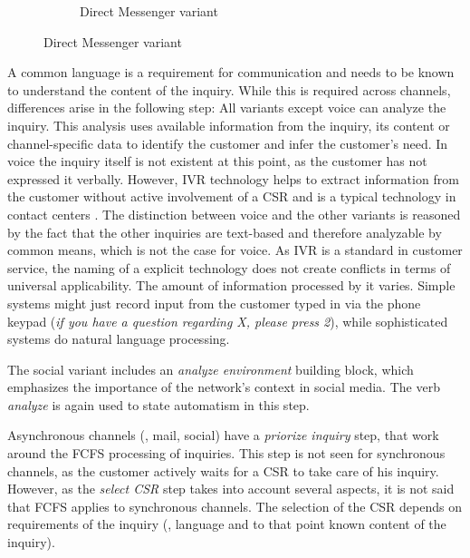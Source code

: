 \begin{figure}[caption={route inquiry detail process}, label={fig:inbound:route}]
\begin{subfigure}[b]{.45\textwidth}
\begin{tikzpicture}
	 		\end{tikzpicture}
	 		\caption{Direct Messenger variant}\label{fig:inbound:route:dm}
	 	\end{subfigure}
	 \end{figure}
	 
	 A common language is a requirement for communication and needs to be known to understand the content of the inquiry. While this is required across channels, differences arise in the following step: All variants except voice can analyze the inquiry. This analysis uses available information from the inquiry, \ie its content or channel-specific data to identify the customer and infer the customer's need. In voice the inquiry itself is not existent at this point, as the customer has not expressed it verbally. However, \acrfull{IVR} technology helps to extract information from the customer without active involvement of a \acrshort{CSR} and is a typical technology in contact centers \citep{Thomas:2009}. The distinction between voice and the other variants is reasoned by the fact that the other inquiries are text-based and therefore analyzable by common means, which is not the case for voice. As \acrshort{IVR} is a standard in customer service, the naming of a explicit technology does not create conflicts in terms of universal applicability. The amount of information processed by it varies. Simple systems might just record input from the customer typed in via the phone keypad (\textit{if you have  a question regarding X, please press 2}), while sophisticated systems do natural language processing.
	 
	 The social variant includes an \textit{analyze environment} building block, which emphasizes the importance of the network's context in social media. The verb \textit{analyze} is again used to state automatism in this step. 
	 
	 Asynchronous channels (\ie, mail, social) have a \textit{priorize inquiry} step, that work around the \acrshort{FCFS} processing of inquiries. This step is not seen for synchronous channels, as the customer actively waits for a \acrshort{CSR} to take care of his inquiry. However, as the \textit{select  \acrshort{CSR}} step takes into account several aspects, it is not said that \acrshort{FCFS} applies to synchronous channels. The selection of the  \acrshort{CSR} depends on requirements of the inquiry (\ie, language and to that point known content of the inquiry). 
	 
